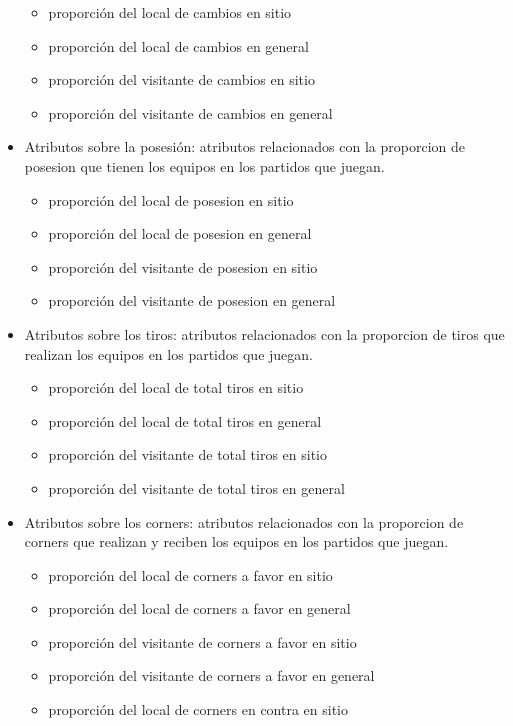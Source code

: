 \begin{itemize}
    \begin{itemize}
        \item proporción del local de cambios en sitio
        \item proporción del local de cambios en general
        \item proporción del visitante de cambios en sitio
        \item proporción del visitante de cambios en general
    \end{itemize}
    \item Atributos sobre la posesión: atributos relacionados con la proporcion de posesion que tienen los equipos en los partidos que juegan.
    \begin{itemize}
        \item proporción del local de posesion en sitio
        \item proporción del local de posesion en general
        \item proporción del visitante de posesion en sitio
        \item proporción del visitante de posesion en general
    \end{itemize}
    \item Atributos sobre los tiros: atributos relacionados con la proporcion de tiros que realizan los equipos en los partidos que juegan.
    \begin{itemize}
        \item proporción del local de total tiros en sitio
        \item proporción del local de total tiros en general
        \item proporción del visitante de total tiros en sitio
        \item proporción del visitante de total tiros en general
    \end{itemize}
    \item Atributos sobre los corners: atributos relacionados con la proporcion de corners que realizan y reciben los equipos en los partidos que juegan.
    \begin{itemize}
        \item proporción del local de corners a favor en sitio
        \item proporción del local de corners a favor en general
        \item proporción del visitante de corners a favor en sitio
        \item proporción del visitante de corners a favor en general
        \item proporción del local de corners en contra en sitio

\end{itemize}
\end{itemize}
